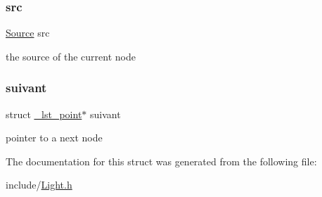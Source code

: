 \subsubsection{\texorpdfstring{src}{src}}
{\footnotesize\ttfamily \hyperlink{struct_source}{Source} src}

the source of the current node \mbox{\label{struct__lst__point_a762f437c3be21ea03bd41426932c4547}} 
\subsubsection{\texorpdfstring{suivant}{suivant}}
{\footnotesize\ttfamily struct \hyperlink{struct__lst__point}{\+\_\+lst\+\_\+point}$\ast$ suivant}

pointer to a next node 

The documentation for this struct was generated from the following file\+:\begin{DoxyCompactItemize}
\item 
include/\hyperlink{_light_8h}{Light.\+h}\end{DoxyCompactItemize}
